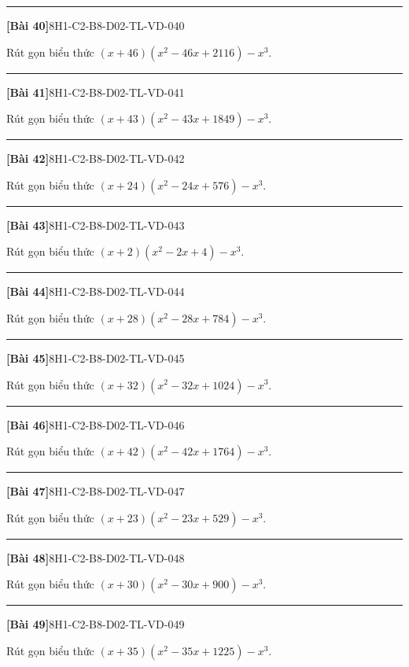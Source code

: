 \documentclass[12pt,a4paper]{article}
\newif\ifloigiai
\newenvironment{cauhoi}[2]{%
  \par\medskip\noindent\rule{\textwidth}{0.4pt}\par\nopagebreak
  \noindent\textbf{[#1]}\hfill{\scriptsize\ttfamily #2}\par\nopagebreak\smallskip}{\par}
\newcommand{\loigiai}[1]{\ifloigiai\par\smallskip\noindent\textit{Lời giải.} #1\par\fi}
\begin{document}
\begin{cauhoi}{Bài 40}{8H1-C2-B8-D02-TL-VD-040}
Rút gọn biểu thức $(x+46)(x^{2}-46x+2116)-x^{3}$.
\loigiai{Ta có $(x+46)(x^{2}-46x+2116)=x^{3}+97336$ nên biểu thức bằng $x^{3}+97336-x^{3}=97336$.}
\end{cauhoi}
\begin{cauhoi}{Bài 41}{8H1-C2-B8-D02-TL-VD-041}
Rút gọn biểu thức $(x+43)(x^{2}-43x+1849)-x^{3}$.
\loigiai{Ta có $(x+43)(x^{2}-43x+1849)=x^{3}+79507$ nên biểu thức bằng $x^{3}+79507-x^{3}=79507$.}
\end{cauhoi}
\begin{cauhoi}{Bài 42}{8H1-C2-B8-D02-TL-VD-042}
Rút gọn biểu thức $(x+24)(x^{2}-24x+576)-x^{3}$.
\loigiai{Ta có $(x+24)(x^{2}-24x+576)=x^{3}+13824$ nên biểu thức bằng $x^{3}+13824-x^{3}=13824$.}
\end{cauhoi}
\begin{cauhoi}{Bài 43}{8H1-C2-B8-D02-TL-VD-043}
Rút gọn biểu thức $(x+2)(x^{2}-2x+4)-x^{3}$.
\loigiai{Ta có $(x+2)(x^{2}-2x+4)=x^{3}+8$ nên biểu thức bằng $x^{3}+8-x^{3}=8$.}
\end{cauhoi}
\begin{cauhoi}{Bài 44}{8H1-C2-B8-D02-TL-VD-044}
Rút gọn biểu thức $(x+28)(x^{2}-28x+784)-x^{3}$.
\loigiai{Ta có $(x+28)(x^{2}-28x+784)=x^{3}+21952$ nên biểu thức bằng $x^{3}+21952-x^{3}=21952$.}
\end{cauhoi}
\begin{cauhoi}{Bài 45}{8H1-C2-B8-D02-TL-VD-045}
Rút gọn biểu thức $(x+32)(x^{2}-32x+1024)-x^{3}$.
\loigiai{Ta có $(x+32)(x^{2}-32x+1024)=x^{3}+32768$ nên biểu thức bằng $x^{3}+32768-x^{3}=32768$.}
\end{cauhoi}
\begin{cauhoi}{Bài 46}{8H1-C2-B8-D02-TL-VD-046}
Rút gọn biểu thức $(x+42)(x^{2}-42x+1764)-x^{3}$.
\loigiai{Ta có $(x+42)(x^{2}-42x+1764)=x^{3}+74088$ nên biểu thức bằng $x^{3}+74088-x^{3}=74088$.}
\end{cauhoi}
\begin{cauhoi}{Bài 47}{8H1-C2-B8-D02-TL-VD-047}
Rút gọn biểu thức $(x+23)(x^{2}-23x+529)-x^{3}$.
\loigiai{Ta có $(x+23)(x^{2}-23x+529)=x^{3}+12167$ nên biểu thức bằng $x^{3}+12167-x^{3}=12167$.}
\end{cauhoi}
\begin{cauhoi}{Bài 48}{8H1-C2-B8-D02-TL-VD-048}
Rút gọn biểu thức $(x+30)(x^{2}-30x+900)-x^{3}$.
\loigiai{Ta có $(x+30)(x^{2}-30x+900)=x^{3}+27000$ nên biểu thức bằng $x^{3}+27000-x^{3}=27000$.}
\end{cauhoi}
\begin{cauhoi}{Bài 49}{8H1-C2-B8-D02-TL-VD-049}
Rút gọn biểu thức $(x+35)(x^{2}-35x+1225)-x^{3}$.
\loigiai{Ta có $(x+35)(x^{2}-35x+1225)=x^{3}+42875$ nên biểu thức bằng $x^{3}+42875-x^{3}=42875$.}
\end{cauhoi}
\end{document}
